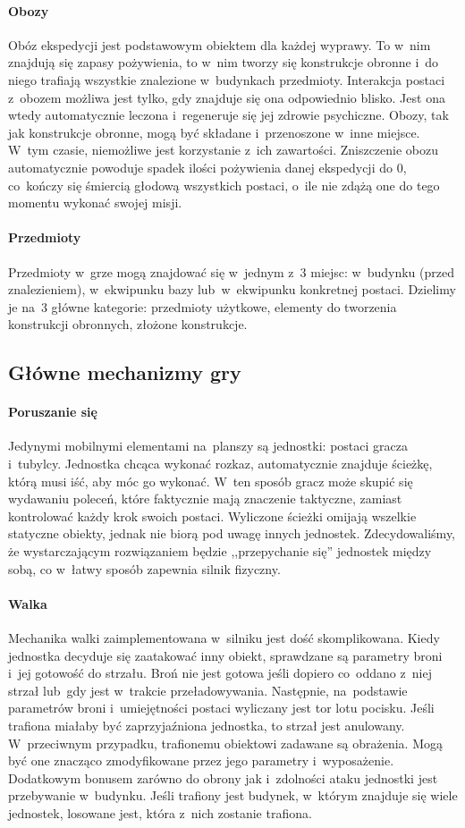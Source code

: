 \documentclass[licencjacka]{pracamgr}
\begin{document}
      \paragraph{Obozy}
	Obóz ekspedycji jest podstawowym obiektem dla każdej wyprawy. To w~nim znajdują się zapasy pożywienia, to w~nim tworzy
	się konstrukcje obronne i~do niego trafiają wszystkie znalezione w~budynkach przedmioty. Interakcja postaci z~obozem
	możliwa jest tylko, gdy znajduje się ona odpowiednio blisko. Jest ona wtedy automatycznie leczona i~regeneruje się
	jej zdrowie psychiczne. Obozy, tak jak konstrukcje obronne, mogą być składane i~przenoszone w~inne miejsce. W~tym czasie,
	niemożliwe jest korzystanie z~ich zawartości. Zniszczenie obozu automatycznie powoduje spadek ilości pożywienia danej
	ekspedycji do 0, co~kończy się śmiercią głodową wszystkich postaci, o~ile nie zdążą one do tego momentu wykonać swojej misji.
      \paragraph{Przedmioty}
	Przedmioty w~grze mogą znajdować się w~jednym z~3 miejsc: w~budynku (przed znalezieniem), w~ekwipunku bazy lub~w~ekwipunku konkretnej
	postaci. Dzielimy je na~3 główne kategorie: przedmioty użytkowe, elementy do tworzenia konstrukcji obronnych, złożone konstrukcje.

    \subsection{Główne mechanizmy gry}
      \paragraph{Poruszanie się}
	Jedynymi mobilnymi elementami na~planszy są jednostki: postaci gracza i~tubylcy. Jednostka chcąca wykonać rozkaz, automatycznie znajduje
	ścieżkę, którą musi iść, aby móc go wykonać. W~ten sposób gracz może skupić się wydawaniu poleceń, które faktycznie mają
	znaczenie taktyczne, zamiast kontrolować każdy krok swoich postaci. Wyliczone ścieżki omijają wszelkie statyczne obiekty, jednak
	nie biorą pod uwagę innych jednostek. Zdecydowaliśmy, że wystarczającym rozwiązaniem będzie ,,przepychanie się'' jednostek między sobą,
	co w~łatwy sposób zapewnia silnik fizyczny.
      \paragraph{Walka}
	Mechanika walki zaimplementowana w~silniku jest dość skomplikowana. Kiedy jednostka decyduje się zaatakować inny obiekt,
	sprawdzane są parametry broni i~jej gotowość do strzału. Broń nie jest gotowa jeśli dopiero co~oddano z~niej strzał lub~gdy
	jest w~trakcie przeładowywania. Następnie, na~podstawie parametrów broni i~umiejętności postaci wyliczany jest tor lotu pocisku.
	Jeśli trafiona miałaby być zaprzyjaźniona jednostka, to strzał jest anulowany. W~przeciwnym przypadku, trafionemu obiektowi zadawane są
	obrażenia. Mogą być one znacząco zmodyfikowane przez jego parametry i~wyposażenie. Dodatkowym bonusem zarówno do obrony jak i~zdolności
	ataku jednostki jest przebywanie w~budynku. Jeśli trafiony jest budynek, w~którym znajduje się wiele jednostek, losowane jest, która z~nich
	zostanie trafiona.
\end{document}
